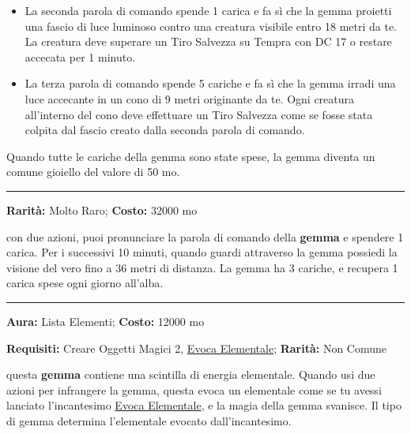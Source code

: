 \begin{multicols}{2}
\begin{itemize}[leftmargin=*]
\item
La seconda parola di comando spende 1 carica e fa sì che la gemma proietti una fascio di luce luminoso contro una creatura visibile entro 18 metri da te. La creatura deve superare un Tiro Salvezza su Tempra con DC 17 o restare accecata per 1 minuto.

\item
La terza parola di comando spende 5 cariche e fa sì che la gemma irradi una luce accecante in un cono di 9 metri originante da te. Ogni creatura all'interno del cono deve effettuare un Tiro Salvezza come se fosse stata colpita dal fascio creato dalla seconda parola di comando.

\end{itemize}

\medskip

Quando tutte le cariche della gemma sono state spese, la gemma diventa un comune gioiello del valore di 50 mo.

\smallskip\noindent\rule{\linewidth}{2pt}  \hypertarget{GemmadellaVista}{}\smallskip{}\noindent\label{GemmadellaVista}

\textbf{Rarità:} Molto Raro; \textbf{Costo:} 32000 mo

con due azioni, puoi pronunciare la parola di comando della \textbf{gemma} e spendere 1 carica. Per i successivi 10 minuti, quando guardi attraverso la gemma possiedi la visione del vero fino a 36 metri di distanza. La gemma ha 3 cariche, e recupera 1 carica spese ogni giorno all'alba.

\smallskip\noindent\rule{\linewidth}{2pt}  \hypertarget{GemmaElementale}{}\smallskip{}\noindent\label{GemmaElementale}

\textbf{Aura:} Lista Elementi; \textbf{Costo:} 12000 mo

\textbf{Requisiti:} Creare Oggetti Magici 2, \hyperlink{Evoca Elementale}{Evoca Elementale}; \textbf{Rarità:} Non Comune

questa \textbf{gemma} contiene una scintilla di energia elementale. Quando usi due azioni per infrangere la gemma, questa evoca un elementale come se tu avessi lanciato l'incantesimo \hyperlink{Evoca Elementale}{Evoca Elementale}, e la magia della gemma svanisce. Il tipo di gemma determina l'elementale evocato dall'incantesimo.


\end{multicols}
